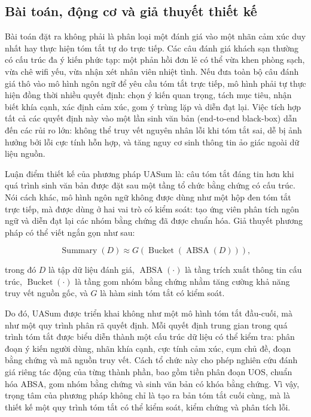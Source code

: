 \subsection{Bài toán, động cơ và giả thuyết thiết kế}
\label{subsec:method1-problem-motivation}

Bài toán đặt ra không phải là phân loại một đánh giá vào một nhãn cảm xúc duy nhất hay thực hiện tóm tắt tự do trực tiếp. Các câu đánh giá khách sạn thường có cấu trúc đa ý kiến phức tạp: một phản hồi đơn lẻ có thể vừa khen phòng sạch, vừa chê wifi yếu, vừa nhận xét nhân viên nhiệt tình. Nếu đưa toàn bộ câu đánh giá thô vào mô hình ngôn ngữ để yêu cầu tóm tắt trực tiếp, mô hình phải tự thực hiện đồng thời nhiều quyết định: chọn ý kiến quan trọng, tách mục tiêu, nhận biết khía cạnh, xác định cảm xúc, gom ý trùng lặp và diễn đạt lại. Việc tích hợp tất cả các quyết định này vào một lần sinh văn bản (end-to-end black-box) dẫn đến các rủi ro lớn: không thể truy vết nguyên nhân lỗi khi tóm tắt sai, dễ bị ảnh hưởng bởi lỗi cực tính hỗn hợp, và tăng nguy cơ sinh thông tin ảo giác ngoài dữ liệu nguồn.

Luận điểm thiết kế của phương pháp UASum là: câu tóm tắt đáng tin hơn khi quá trình sinh văn bản được đặt sau một tầng tổ chức bằng chứng có cấu trúc. Nói cách khác, mô hình ngôn ngữ không được dùng như một hộp đen tóm tắt trực tiếp, mà được dùng ở hai vai trò có kiểm soát: tạo ứng viên phân tích ngôn ngữ và diễn đạt lại các nhóm bằng chứng đã được chuẩn hóa. Giả thuyết phương pháp có thể viết ngắn gọn như sau:

\begin{equation}
\operatorname{Summary}(D) \approx G\left(\operatorname{Bucket}\left(\operatorname{ABSA}(D)\right)\right),
\label{eq:method1-uasum-hypothesis}
\end{equation}

trong đó $D$ là tập dữ liệu đánh giá, $\operatorname{ABSA}(\cdot)$ là tầng trích xuất thông tin cấu trúc, $\operatorname{Bucket}(\cdot)$ là tầng gom nhóm bằng chứng nhằm tăng cường khả năng truy vết nguồn gốc, và $G$ là hàm sinh tóm tắt có kiểm soát.

Do đó, UASum được triển khai không như một mô hình tóm tắt đầu-cuối, mà như một quy trình phân rã quyết định. Mỗi quyết định trung gian trong quá trình tóm tắt được biểu diễn thành một cấu trúc dữ liệu có thể kiểm tra: phân đoạn ý kiến người dùng, nhãn khía cạnh, cực tính cảm xúc, cụm chủ đề, đoạn bằng chứng và mã nguồn truy vết. Cách tổ chức này cho phép nghiên cứu đánh giá riêng tác động của từng thành phần, bao gồm tiền phân đoạn UOS, chuẩn hóa ABSA, gom nhóm bằng chứng và sinh văn bản có khóa bằng chứng. Vì vậy, trọng tâm của phương pháp không chỉ là tạo ra bản tóm tắt cuối cùng, mà là thiết kế một quy trình tóm tắt có thể kiểm soát, kiểm chứng và phân tích lỗi.

